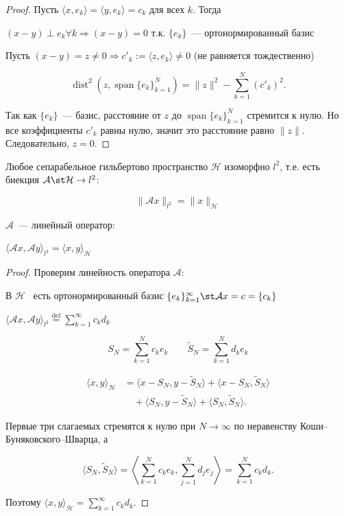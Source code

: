 \begin{proof}
	Пусть $\langle x,e_k \rangle = \langle y,e_k \rangle = c_k$ для всех $k$. Тогда
	
	$(x - y) \perp e_k  \forall  k \Rightarrow (x - y) = 0$ т.к. $\{e_k\}$~--- ортонормированный базис
	
	Пусть $(x-y) = z \neq 0 \Rightarrow c'_k :=  \langle z, e_k \rangle  \neq 0$ (не равняется тождественно)
	
	\[ \operatorname{dist}^2(z, \operatorname{span}\{e_k\}_{k=1}^N) = \|z\|^2 - \sum_{k=1}^N (c'_k)^2. \]
	
	Так как $\{e_k\}$~--- базис, расстояние от $z$ до $\operatorname{span}\{e_k\}_{k=1}^N$ стремится к нулю. Но все коэффициенты $c'_k$ равны нулю, значит это расстояние равно $\|z\|$. Следовательно, $z=0$.
\end{proof}


\begin{Corollary}{}{}
	Любое сепарабельное гильбертово пространство $\mathcal{H}$ изоморфно $l^2$, т.е. есть биекция $\mathcal{A} \st \mathcal{H} \rightarrow l^2$:
	
	\[  \|\mathcal{A}x\|_{l^2} = \|x\|_{\mathcal{H}} \]
	
	$\mathcal{A}$~--- линейный оператор:
	
	$ \langle \mathcal{A}x, \mathcal{A}y \rangle _{l^2} =  \langle x, y \rangle _{\mathcal{H}}$
\end{Corollary}

\begin{proof}
	
	Проверим линейность оператора $\mathcal{A}$:
	
	В $\mathcal{H}$~ есть ортонормированный базис $\{e_k\}_{k=1}^\infty \st \mathcal{A}x = c = \{ c_k \}$
	
	$ \langle \mathcal{A}x, \mathcal{A}y \rangle _{l^2} \overset{\text{def}}{=} \sum_{k=1}^\infty c_k d_k$
	
	\[ 
	S_N = \sum_{k=1}^N c_k e_k \qquad \tilde S_N = \sum_{k=1}^N d_k e_k
	\]
	
	\[
	\begin{aligned}
		\langle x,y \rangle_{\mathcal H}
		&= \langle x-S_N, y-\tilde S_N \rangle
		+ \langle x-S_N, \tilde S_N \rangle \\
		&\quad + \langle S_N, y-\tilde S_N \rangle
		+ \langle S_N, \tilde S_N \rangle.
	\end{aligned}
	\]
	
	Первые три слагаемых стремятся к нулю при $N \to \infty$ по неравенству Коши--Буняковского--Шварца, а
	
	\[  \langle S_N, \tilde S_N \rangle  =  \left\langle \sum_{k=1}^N c_k e_k, \sum_{j=1}^N d_j e_j \right\rangle  = \sum_{k=1}^N c_k d_k. \]
	
	Поэтому $ \langle x,y \rangle_{\mathcal H} = \sum_{k=1}^\infty c_k d_k. $
	
\end{proof}

